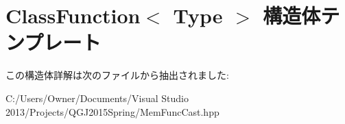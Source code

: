 \hypertarget{struct_class_function}{}\section{Class\+Function$<$ Type $>$ 構造体テンプレート}
\label{struct_class_function}


この構造体詳解は次のファイルから抽出されました\+:\begin{DoxyCompactItemize}
\item 
C\+:/\+Users/\+Owner/\+Documents/\+Visual Studio 2013/\+Projects/\+Q\+G\+J2015\+Spring/Mem\+Func\+Cast.\+hpp\end{DoxyCompactItemize}
